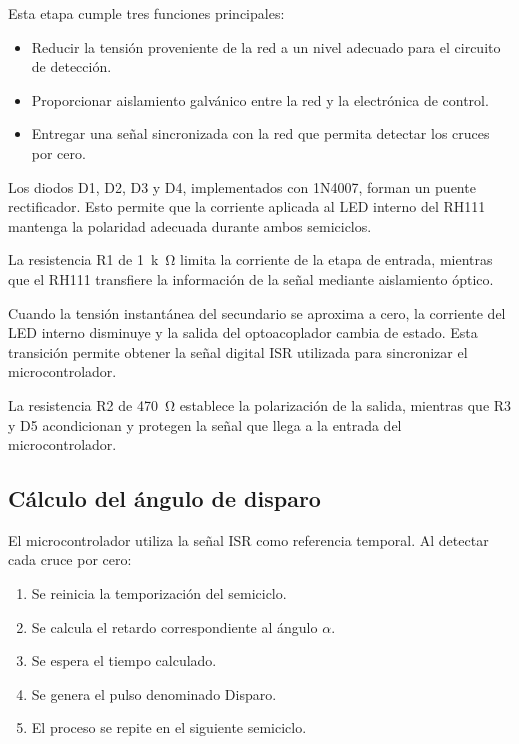 \documentclass[12pt]{article}
\begin{document}
Esta etapa cumple tres funciones principales:

\begin{itemize}
    \item Reducir la tensión proveniente de la red a un nivel adecuado para
    el circuito de detección.

    \item Proporcionar aislamiento galvánico entre la red y la electrónica
    de control.

    \item Entregar una señal sincronizada con la red que permita detectar
    los cruces por cero.
\end{itemize}

Los diodos D1, D2, D3 y D4, implementados con 1N4007, forman un puente
rectificador. Esto permite que la corriente aplicada al LED interno del
RH111 mantenga la polaridad adecuada durante ambos semiciclos.

La resistencia R1 de \SI{1}{k\ohm} limita la corriente de la etapa de entrada,
mientras que el RH111 transfiere la información de la señal mediante
aislamiento óptico.

Cuando la tensión instantánea del secundario se aproxima a cero, la corriente
del LED interno disminuye y la salida del optoacoplador cambia de estado.
Esta transición permite obtener la señal digital ISR utilizada para
sincronizar el microcontrolador.

La resistencia R2 de \SI{470}{\ohm} establece la polarización de la salida,
mientras que R3 y D5 acondicionan y protegen la señal que llega a la entrada
del microcontrolador.

\subsection{Cálculo del ángulo de disparo}

El microcontrolador utiliza la señal ISR como referencia temporal. Al detectar
cada cruce por cero:

\begin{enumerate}
    \item Se reinicia la temporización del semiciclo.
    \item Se calcula el retardo correspondiente al ángulo $\alpha$.
    \item Se espera el tiempo calculado.
    \item Se genera el pulso denominado Disparo.
    \item El proceso se repite en el siguiente semiciclo.
\end{enumerate}
\end{document}
